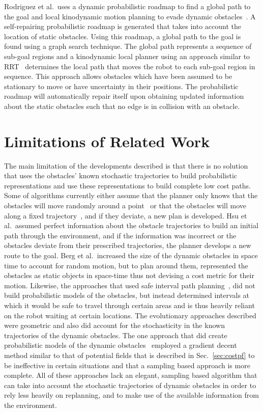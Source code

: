 Rodriguez et al.\ uses a dynamic probabilistic roadmap to find a global path to
the goal and local kinodynamic motion planning to evade dynamic
obstacles~\cite{rodriguez2007framework}. A self-repairing probabilistic roadmap
is generated that takes into account the location of static obstacles. Using
this roadmap, a global path to the goal is found using a graph search
technique. The global path represents a sequence of sub-goal regions and a
kinodynamic local planner using an approach similar to RRT~\cite{rrt}
determines the local path that moves the robot to each sub-goal region in
sequence. This approach allows obstacles which have been assumed to be
stationary to move or have uncertainty in their positions. The probabilistic
roadmap will automatically repair itself upon obtaining updated information
about the static obstacles such that no edge is in collision with an obstacle.

\section{Limitations of Related Work}

The main limitation of the developments described is that there is no solution
that uses the obstacles' known stochastic trajectories to build probabilistic
representations and use these representations to build complete low cost paths.
Some of algorithms currently either assume that the planner only knows that the
obstacles will move randomly around a point~\cite{rodriguez2007framework} or
that the obstacles will move along a fixed trajectory~\cite{hsu2002randomized},
and if they deviate, a new plan is developed. Hsu et al.\ assumed perfect
information about the obstacle trajectories to build an initial path through
the environment, and if the information was incorrect or the obstacles deviate
from their prescribed trajectories, the planner develops a new route to the
goal. Berg et al.\ increased the size of the dynamic obstacles in space time to
account for random motion, but to plan around them, represented the obstacles
as static objects in space-time thus not devising a cost metric for their
motion. Likewise, the approaches that used safe interval path
planning~\cite{asipp, sipp}, did not build probabilistic models of the
obstacles, but instead determined intervals at which it would be safe to travel
through certain areas and is thus heavily reliant on the robot waiting at
certain locations. The evolutionary approaches described were geometric and
also did account for the stochasticity in the known trajectories of the dynamic
obstacles. The one approach that did create probabilistic models of the dynamic
obstacles~\cite{jensen2003motion} employed a gradient decent method similar to
that of potential fields that is described in Sec.~\ref{sec:costpf} to be
ineffective in certain situations and that a sampling based approach is more
complete. All of these approaches lack an elegant, sampling based algorithm
that can take into account the stochastic trajectories of dynamic obstacles in
order to rely less heavily on replanning, and to make use of the available
information from the environment.


